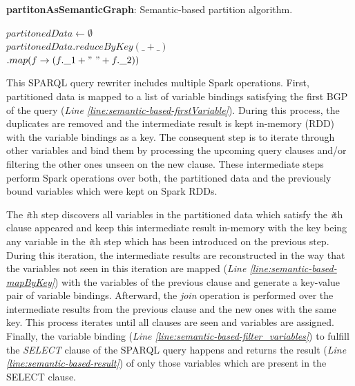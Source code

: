 \begin{algorithm*}
\caption{\textbf{partitonAsSemanticGraph}: Semantic-based partition algorithm.}
\label{alg:semantic-based-partitionGraph}
$partitonedData \leftarrow \emptyset $\\
        $partitonedData.reduceByKey(\_+\_)$\label{line:semantic-based-groupBy}\\
        \quad \quad \quad \quad \quad \quad $.map(f\rightarrow(f.\_1 + "~" + f.\_2))$ \label{line:semantic-based-partitionGraph_map}\\
\end{algorithm*}


This \gls{SPARQL} query rewriter includes multiple Spark operations.
First, partitioned data is mapped to a list of variable bindings satisfying the first \gls{BGP} of the query (\textit{Line \ref{line:semantic-based-firstVariable}}). 
During this process, the duplicates are removed and the intermediate result is kept in-memory (\gls{RDD}) with the variable bindings as a key.
The consequent step is to iterate through other variables and bind them by processing the upcoming query clauses and/or filtering the other ones unseen on the new clause.
These intermediate steps perform Spark operations over both, the partitioned data and the previously bound variables which were kept on Spark \gls{RDD}s.

The \textit{i}th step discovers all variables in the partitioned data which satisfy the \textit{i}th clause appeared and keep this intermediate result in-memory with the key being any variable in the \textit{i}th step which has been introduced on the previous step.
During this iteration, the intermediate results are reconstructed in the way that the variables not seen in this iteration are mapped (\textit{Line \ref{line:semantic-based-mapByKey}}) with the variables of the previous clause and generate a key-value pair of variable bindings.
Afterward, the \emph{join} operation is performed over the intermediate results from the previous clause and the new ones with the same key.
This process iterates until all clauses are seen and variables are assigned.
Finally, the variable binding (\textit{Line \ref{line:semantic-based-filter_variables}}) to fulfill the \emph{SELECT} clause of the \gls{SPARQL} query happens and returns the result (\textit{Line \ref{line:semantic-based-result}}) of only those variables which are present in the SELECT clause.


